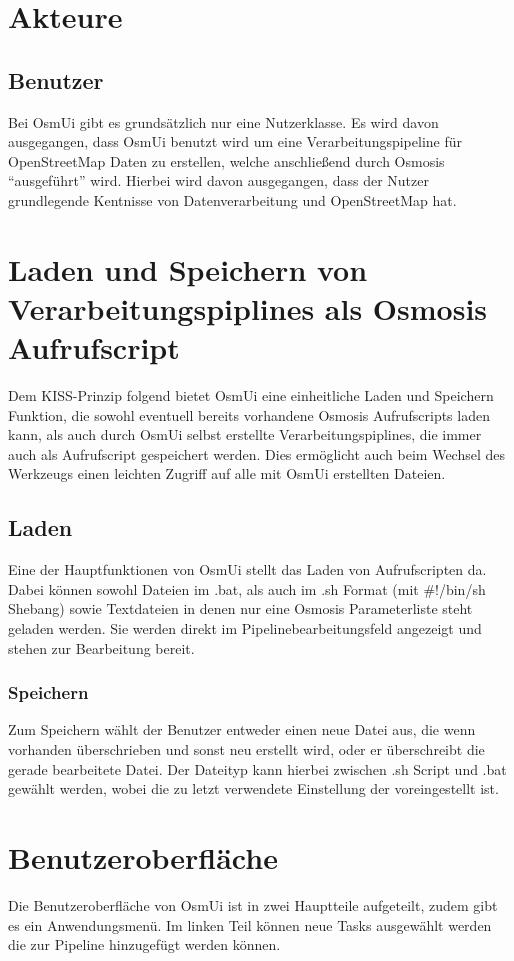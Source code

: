 \documentclass[a4paper,10pt]{scrartcl}
\begin{document}
\section{Akteure}
\subsection{Benutzer}
Bei OsmUi gibt es grundsätzlich nur eine Nutzerklasse. Es wird davon ausgegangen, dass OsmUi benutzt wird um eine Verarbeitungspipeline für OpenStreetMap Daten
zu erstellen, welche anschließend durch Osmosis ``ausgeführt'' wird. Hierbei wird davon ausgegangen, dass der Nutzer grundlegende Kentnisse 
von Datenverarbeitung und OpenStreetMap hat.
\section{Laden und Speichern von Verarbeitungspiplines als Osmosis Aufrufscript}
Dem KISS-Prinzip folgend bietet OsmUi eine einheitliche Laden und Speichern Funktion, die sowohl eventuell bereits vorhandene Osmosis Aufrufscripts
laden kann, als auch durch OsmUi selbst erstellte Verarbeitungspiplines, die immer auch als Aufrufscript gespeichert werden. 
Dies ermöglicht auch beim Wechsel des Werkzeugs einen leichten Zugriff auf alle mit OsmUi erstellten Dateien.
\subsection{Laden}
Eine der Hauptfunktionen von OsmUi stellt das Laden von Aufrufscripten da. Dabei können sowohl Dateien im .bat, als auch im .sh Format (mit \#!/bin/sh Shebang)
sowie Textdateien in denen nur eine Osmosis Parameterliste steht geladen werden. Sie werden direkt im Pipelinebearbeitungsfeld angezeigt und
stehen zur Bearbeitung bereit.
\subsubsection{Speichern}
Zum Speichern wählt der Benutzer entweder einen neue Datei aus, die wenn vorhanden überschrieben und sonst neu erstellt wird, oder er überschreibt die gerade bearbeitete Datei.
Der Dateityp kann hierbei zwischen .sh Script und .bat gewählt werden, wobei die zu letzt verwendete Einstellung der voreingestellt ist.
\section{Benutzeroberfläche}
Die Benutzeroberfläche von OsmUi ist in zwei Hauptteile aufgeteilt, zudem gibt es ein Anwendungsmenü. Im linken Teil können neue Tasks ausgewählt werden die zur
Pipeline hinzugefügt werden können.
\end{document}
